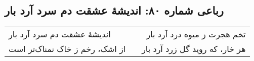 \begin{center}
\section*{رباعی شماره ۸۰: اندیشهٔ عشقت دم سرد آرد بار}
\label{sec:080}
\begin{longtable}{l p{0.5cm} r}
اندیشهٔ عشقت دم سرد آرد بار
&&
تخم هجرت ز میوه درد آرد بار
\\
از اشک، رخم ز خاک نمناک‌تر است
&&
هر خار، که روید گل زرد آرد بار
\\
\end{longtable}
\end{center}
